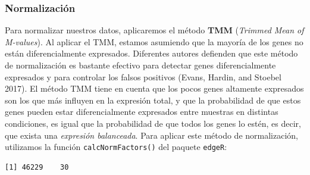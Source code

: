 \documentclass[
  english,
]{article}
\newenvironment{Shaded}{\begin{snugshade}}{\end{snugshade}}
\newcommand{\DataTypeTok}[1]{\textcolor[rgb]{0.13,0.29,0.53}{#1}}
\newcommand{\ErrorTok}[1]{\textcolor[rgb]{0.64,0.00,0.00}{\textbf{#1}}}
\newcommand{\KeywordTok}[1]{\textcolor[rgb]{0.13,0.29,0.53}{\textbf{#1}}}
\newcommand{\NormalTok}[1]{#1}
\newcommand{\OperatorTok}[1]{\textcolor[rgb]{0.81,0.36,0.00}{\textbf{#1}}}
\newcommand{\OtherTok}[1]{\textcolor[rgb]{0.56,0.35,0.01}{#1}}
\newcommand{\StringTok}[1]{\textcolor[rgb]{0.31,0.60,0.02}{#1}}
\begin{document}
\begin{Shaded}
\end{Shaded}

\hypertarget{normalizaciuxf3n}{%
\subsubsection{Normalización}\label{normalizaciuxf3n}}

Para normalizar nuestros datos, aplicaremos el método \textbf{TMM}
(\emph{Trimmed Mean of M-values}). Al aplicar el TMM, estamos asumiendo
que la mayoría de los genes no están diferencialmente expresados.
Diferentes autores defienden que este método de normalización es
bastante efectivo para detectar genes diferencialmente expresados y para
controlar los falsos positivos (Evans, Hardin, and Stoebel 2017). El
método TMM tiene en cuenta que los pocos genes altamente expresados son
los que más influyen en la expresión total, y que la probabilidad de que
estos genes pueden estar diferencialmente expresados entre muestras en
distintas condiciones, es igual que la probabilidad de que todos los
genes lo estén, es decir, que exista una \emph{expresión balanceada}.
Para aplicar este método de normalización, utilizamos la función
\texttt{calcNormFactors()} del paquete \texttt{edgeR}:

\begin{Shaded}
\end{Shaded}

\begin{verbatim}
[1] 46229    30
\end{verbatim}
\end{document}
